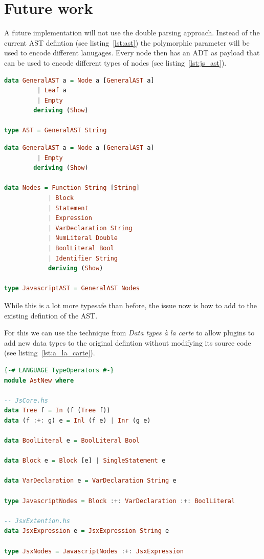 \section{Future work}
\label{sec:future_work}

A future implementation will not use the double parsing approach. Instead of the current AST defintion (see listing~\ref{lst:ast}) the polymorphic parameter will be used to encode different lanugages. Every node then has an ADT as payload that can be used to encode different types of nodes (see listing~\ref{lst:js_ast}).

\begin{lstlisting}[linewidth=\columnwidth, caption={Current AST defintion}, captionpos=b, label=lst:ast, language=Haskell, breaklines=true]
data GeneralAST a = Node a [GeneralAST a]
         | Leaf a
         | Empty
        deriving (Show)

type AST = GeneralAST String
\end{lstlisting}

\begin{lstlisting}[linewidth=\columnwidth, caption={Example Javascript AST defintion}, captionpos=b, label=lst:js_ast, language=Haskell, breaklines=true]
data GeneralAST a = Node a [GeneralAST a]
         | Empty
        deriving (Show)

data Nodes = Function String [String]
            | Block
            | Statement
            | Expression
            | VarDeclaration String
            | NumLiteral Double
            | BoolLiteral Bool
            | Identifier String
            deriving (Show)

type JavascriptAST = GeneralAST Nodes
\end{lstlisting}

While this is a lot more typesafe than before, the issue now is how to add to the existing defintion of the AST.

For this we can use the technique from \textit{Data types \`a la carte} \cite{data_types} to allow plugins to add new data types to the original defintion without modifying its source code (see listing~\ref{lst:a_la_carte}).

\begin{lstlisting}[linewidth=\columnwidth, caption={Addition to sum type using type operators}, captionpos=b, label=lst:a_la_carte, language=Haskell, breaklines=true]
{-# LANGUAGE TypeOperators #-}
module AstNew where

-- JsCore.hs
data Tree f = In (f (Tree f))
data (f :+: g) e = Inl (f e) | Inr (g e)

data BoolLiteral e = BoolLiteral Bool

data Block e = Block [e] | SingleStatement e

data VarDeclaration e = VarDeclaration String e

type JavascriptNodes = Block :+: VarDeclaration :+: BoolLiteral

-- JsxExtention.hs
data JsxExpression e = JsxExpression String e

type JsxNodes = JavascriptNodes :+: JsxExpression
\end{lstlisting}

